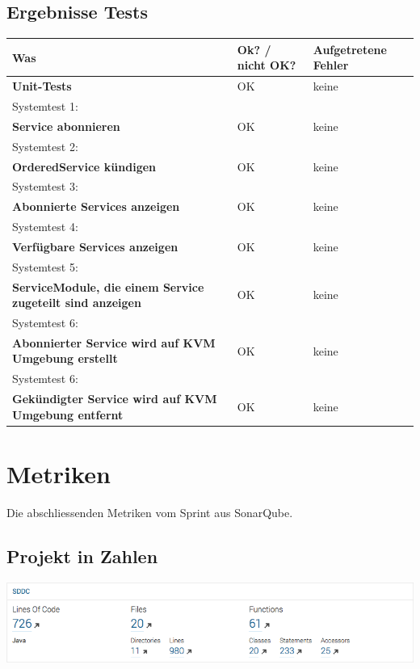 \documentclass[11pt]{scrartcl}
\begin{document}
\subsection{Ergebnisse Tests}
\begin{tabularx}{\linewidth}{X l l}
\textbf{Was} & \textbf{Ok? / nicht OK?} & \textbf{Aufgetretene Fehler}\\
\hline
\textbf{Unit-Tests} & {\color{green} OK}  & keine\\
\hline
Systemtest 1: & & \\
\textbf{Service abonnieren} & {\color{green} OK} & keine\\
\hline
Systemtest 2: & & \\
\textbf{OrderedService kündigen} & {\color{green} OK}  & keine\\
\hline
Systemtest 3: & & \\
\textbf{Abonnierte Services anzeigen} & {\color{green} OK}  & keine\\
\hline
Systemtest 4: & & \\
\textbf{Verfügbare Services anzeigen} & {\color{green} OK}  & keine\\
\hline
Systemtest 5: & & \\
\textbf{ServiceModule, die einem Service zugeteilt sind anzeigen} & {\color{green} OK}  & keine\\
\hline
Systemtest 6: & & \\
\textbf{Abonnierter Service wird auf KVM Umgebung erstellt} & {\color{green} OK}  & keine\\
\hline
Systemtest 6: & & \\
\textbf{Gekündigter Service wird auf KVM Umgebung entfernt} & {\color{green} OK}  & keine\\
\hline



\end{tabularx}

\newpage

\section{Metriken}
Die abschliessenden Metriken vom Sprint aus SonarQube.
\subsection{Projekt in Zahlen}
\includegraphics[width=\textwidth]{loc}
\end{document}
